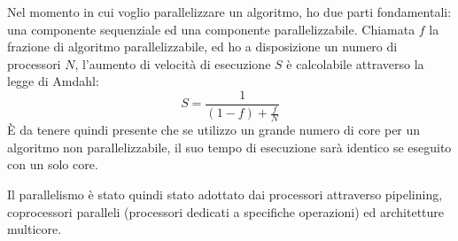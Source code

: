 \documentclass[../ace.tex]{subfiles}
\begin{document}
Nel momento in cui voglio parallelizzare un algoritmo, ho due parti fondamentali: una componente sequenziale ed una componente
parallelizzabile.
Chiamata $f$ la frazione di algoritmo parallelizzabile, ed ho a disposizione un numero di processori $N$, l'aumento di
velocità di esecuzione $S$ è calcolabile attraverso la legge di Amdahl:
\[
    S = \frac{1}{(1 - f) + \frac{f}{N}}
\]
È da tenere quindi presente che se utilizzo un grande numero di core per un algoritmo non parallelizzabile, il suo tempo di
esecuzione sarà identico se eseguito con un solo core.

Il parallelismo è stato quindi stato adottato dai processori attraverso pipelining, coprocessori paralleli (processori dedicati
a specifiche operazioni) ed architetture multicore.
\end{document}
